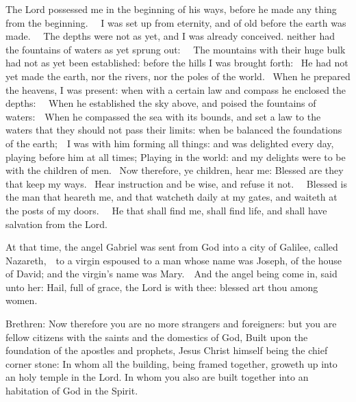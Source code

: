 


\label{Ep.immac}

The Lord possessed me in the beginning of his ways, before he made any thing
from the beginning.   I was set up from eternity, and of old before the earth
was made.   The depths were not as yet, and I was already conceived. neither
had the fountains of waters as yet sprung out:   The mountains with their huge
bulk had not as yet been established: before the hills I was brought forth:  He
had not yet made the earth, nor the rivers, nor the poles of the world.  When
he prepared the heavens, I was present: when with a certain law and compass he
enclosed the depths:   When he established the sky above, and poised the
fountains of waters:  When he compassed the sea with its bounds, and set a law
to the waters that they should not pass their limits: when be balanced the
foundations of the earth;  I was with him forming all things: and was delighted
every day, playing before him at all times; Playing in the world: and my
delights were to be with the children of men.  Now therefore, ye children, hear
me: Blessed are they that keep my ways.  Hear instruction and be wise, and
refuse it not.   Blessed is the man that heareth me, and that watcheth daily at
my gates, and waiteth at the posts of my doors.   He that shall find me, shall
find life, and shall have salvation from the Lord.



At that time, the angel Gabriel was sent from God into a city of
Galilee, called Nazareth,  to a virgin espoused to a man whose name was Joseph,
of the house of David; and the virgin's name was Mary.  And the angel being
come in, said unto her: Hail, full of grace, the Lord is with thee: blessed art
thou among women. 






Brethren: Now therefore you are no more strangers and foreigners: but you
are fellow citizens with the saints and the domestics of God,
Built upon the foundation of the apostles and prophets, Jesus
Christ himself being the chief corner stone:
In whom all the building, being framed together, groweth up into
an holy temple in the Lord.
In whom you also are built together into an habitation of God in
the Spirit.

